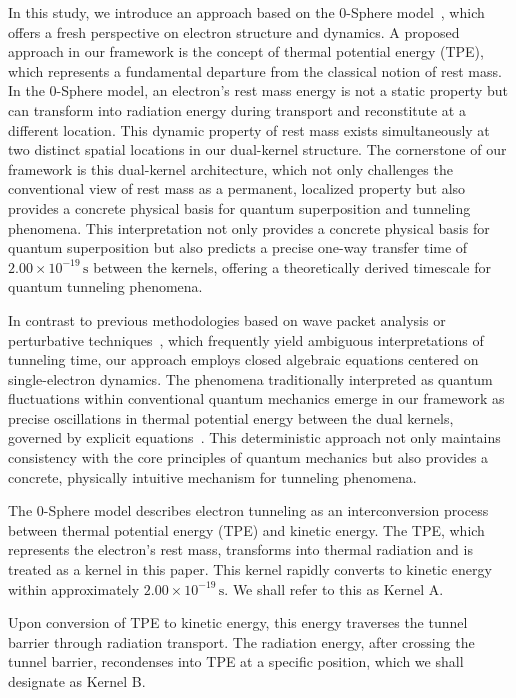 \documentclass[%
 reprint,
 amsmath,amssymb,
 aps,
]{revtex4-1}
\numberwithin{equation}{section}%
\begin{document}
In this study, we introduce an approach based on the 0-Sphere model~\cite{hanamura2023}, which offers a fresh perspective on electron structure and dynamics. A proposed approach in our framework is the concept of thermal potential energy (TPE), which represents a fundamental departure from the classical notion of rest mass. In the 0-Sphere model, an electron's rest mass energy is not a static property but can transform into radiation energy during transport and reconstitute at a different location. This dynamic property of rest mass exists simultaneously at two distinct spatial locations in our dual-kernel structure. The cornerstone of our framework is this dual-kernel architecture, which not only challenges the conventional view of rest mass as a permanent, localized property but also provides a concrete physical basis for quantum superposition and tunneling phenomena. This interpretation not only provides a concrete physical basis for quantum superposition but also predicts a precise one-way transfer time of \( 2.00 \times 10^{-19} \, \mathrm{s} \) between the kernels, offering a theoretically derived timescale for quantum tunneling phenomena.

In contrast to previous methodologies based on wave packet analysis or perturbative techniques~\cite{steinberg1993, buttiker1982}, which frequently yield ambiguous interpretations of tunneling time, our approach employs closed algebraic equations centered on single-electron dynamics. The phenomena traditionally interpreted as quantum fluctuations within conventional quantum mechanics emerge in our framework as precise oscillations in thermal potential energy between the dual kernels, governed by explicit equations~\cite{darwin1928, breit1928}. This deterministic approach not only maintains consistency with the core principles of quantum mechanics but also provides a concrete, physically intuitive mechanism for tunneling phenomena.

The 0-Sphere model describes electron tunneling as an interconversion process between thermal potential energy (TPE) and kinetic energy. The TPE, which represents the electron's rest mass, transforms into thermal radiation and is treated as a kernel in this paper. This kernel rapidly converts to kinetic energy within approximately \( 2.00 \times 10^{-19} \, \mathrm{s} \). We shall refer to this as Kernel A.

Upon conversion of TPE to kinetic energy, this energy traverses the tunnel barrier through radiation transport. The radiation energy, after crossing the tunnel barrier, recondenses into TPE at a specific position, which we shall designate as Kernel B.
\end{document}
